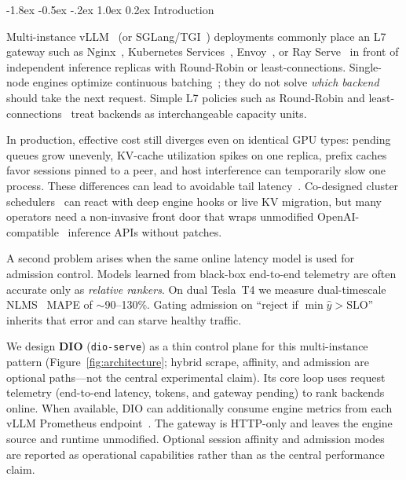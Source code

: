 \documentclass[pdflatex,sn-mathphys-num]{sn-jnl}
\makeatletter
\renewcommand{\section}{\@startsection{section}{1}{\z@}%
  {-1.8ex \@plus -0.5ex \@minus -.2ex}%
  {1.0ex \@plus 0.2ex}%
  {\normalfont\large\bfseries}}%
\makeatother
\begin{document}
\section{Introduction}
\label{sec:intro}

Multi-instance vLLM~\cite{vllm} (or SGLang/TGI~\cite{sglang,tgi,radixattention})
deployments commonly place an L7 gateway such as Nginx~\cite{nginx}, Kubernetes
Services~\cite{kubernetes}, Envoy~\cite{envoy}, or Ray Serve~\cite{rayserve} in
front of independent inference replicas with Round-Robin or least-connections.
Single-node engines optimize continuous batching~\cite{orca,bullet}; they do not
solve \emph{which backend} should take the next request. Simple L7 policies such as
Round-Robin and least-connections~\cite{maglev,nginx} treat backends as
interchangeable capacity units.

In production, effective cost still diverges even on identical GPU types: pending
queues grow unevenly, KV-cache utilization spikes on one replica, prefix caches
favor sessions pinned to a peer, and host interference can temporarily slow one
process. These differences can lead to avoidable tail latency~\cite{dean2013tail}.
Co-designed
cluster schedulers~\cite{nexussched,llumnix,loongserve} can react with deep engine
hooks or live KV migration, but many operators need a non-invasive front door that
wraps unmodified OpenAI-compatible~\cite{openaiapi} inference APIs without patches.

A second problem arises when the same online latency model is used for admission
control. Models learned from black-box end-to-end telemetry are often accurate only
as \emph{relative rankers}. On dual Tesla~T4 we measure dual-timescale
NLMS~\cite{haykin2002adaptive} MAPE of $\sim$90--130\%. Gating admission on
``reject if $\min\hat{y}>\mathrm{SLO}$'' inherits that error and can starve healthy
traffic.

We design \textbf{DIO} (\texttt{dio-serve}) as a thin control plane for this
multi-instance pattern (Figure~\ref{fig:architecture}; hybrid scrape, affinity, and
admission are optional paths---not the central experimental claim). Its core loop
uses request telemetry (end-to-end latency, tokens, and gateway pending) to rank
backends online. When
available, DIO can additionally consume engine metrics from each vLLM Prometheus
endpoint~\cite{prometheus}. The gateway is HTTP-only and leaves the engine source
and runtime unmodified. Optional session affinity and admission modes are reported
as operational capabilities rather than as the central performance claim.
\end{document}
